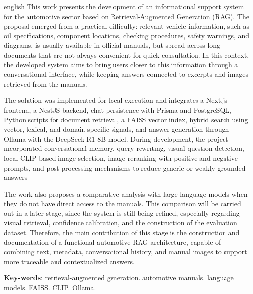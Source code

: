 \begin{resumo}[Abstract]
\begin{otherlanguage*}{english}
This work presents the development of an informational support system for the automotive sector based on Retrieval-Augmented Generation (RAG). The proposal emerged from a practical difficulty: relevant vehicle information, such as oil specifications, component locations, checking procedures, safety warnings, and diagrams, is usually available in official manuals, but spread across long documents that are not always convenient for quick consultation. In this context, the developed system aims to bring users closer to this information through a conversational interface, while keeping answers connected to excerpts and images retrieved from the manuals.

The solution was implemented for local execution and integrates a Next.js frontend, a NestJS backend, chat persistence with Prisma and PostgreSQL, Python scripts for document retrieval, a FAISS vector index, hybrid search using vector, lexical, and domain-specific signals, and answer generation through Ollama with the DeepSeek R1 8B model. During development, the project incorporated conversational memory, query rewriting, visual question detection, local CLIP-based image selection, image reranking with positive and negative prompts, and post-processing mechanisms to reduce generic or weakly grounded answers.

The work also proposes a comparative analysis with large language models when they do not have direct access to the manuals. This comparison will be carried out in a later stage, since the system is still being refined, especially regarding visual retrieval, confidence calibration, and the construction of the evaluation dataset. Therefore, the main contribution of this stage is the construction and documentation of a functional automotive RAG architecture, capable of combining text, metadata, conversational history, and manual images to support more traceable and contextualized answers.

\vspace{\onelineskip}

\noindent
\textbf{Key-words}: retrieval-augmented generation. automotive manuals. language models. FAISS. CLIP. Ollama.
\end{otherlanguage*}
\end{resumo}
